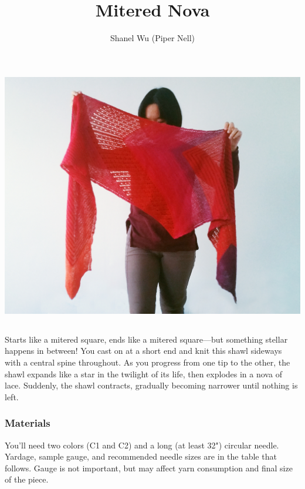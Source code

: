\documentclass[12pt]{article}
\title{Mitered Nova}
\author{Shanel Wu (Piper Nell)}
\begin{document}
\begin{titlingpage}

\includegraphics[width=\textwidth]{LW-holdFront}

\begin{multicols}{2}

\section*{\thetitle}
\subsubsection*{\theauthor}

Starts like a mitered square, ends like a mitered square---but something stellar happens in between! You cast on at a short end and knit this shawl sideways with a central spine throughout. As you progress from one tip to the other, the shawl expands like a star in the twilight of its life, then explodes in a nova of lace. Suddenly, the shawl contracts, gradually becoming narrower until nothing is left.

\vspace{-1em}
\subsubsection*{Materials}

You'll need two colors (C1 and C2) and a long (at least 32") circular needle. \\ Yardage, sample gauge, and recommended needle sizes are in the table that follows. Gauge is not important, but may affect yarn consumption and final size of the piece.


\end{multicols}
\end{titlingpage}
\end{document}
